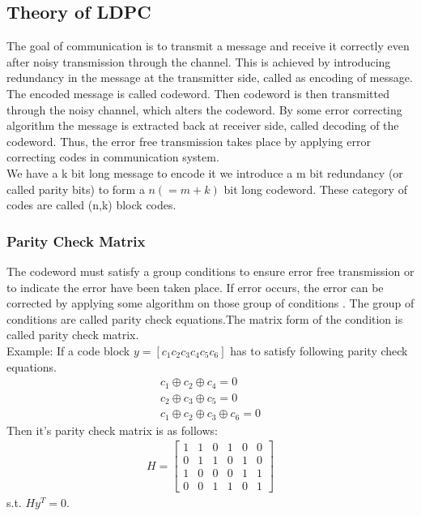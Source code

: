 \documentclass[twopage,12pt,a4paper]{report}
\begin{document}
\begin{raggedright}
\chapter{Theory of LDPC}


The goal of communication is to transmit a message and receive it correctly even after noisy transmission through the channel. This is achieved by introducing redundancy in the message at the transmitter side, called as encoding of message. The encoded message is called codeword. Then codeword is then transmitted through the noisy channel, which alters the codeword. By some error correcting algorithm the message is extracted back at receiver side, called decoding of the codeword. Thus, the error free transmission takes place by applying error correcting codes in communication system.\\
We have a k bit long message to encode it we introduce a m bit redundancy (or called parity bits) to form a $n(=m+k)$ bit long codeword. These category of codes are called (n,k) block codes. 

\subsection{Parity Check Matrix}

The codeword must satisfy a group conditions to ensure error free transmission or to indicate the error have been taken place. If error occurs, the error can be corrected by applying some algorithm on those group of conditions . The group of conditions are called parity check equations.The matrix form of the condition is called parity check matrix. \\
Example: If a code block $y=[c_1 c_2 c_3 c_4 c_5 c_6]$ has to satisfy following parity check equations. 
\begin{align}
c_1 \oplus c_2 \oplus c_4 =0 \\
 c_2 \oplus c_3 \oplus c_5 =0 \\
c_1 \oplus c_2 \oplus c_3 \oplus c_6 =0 
\end{align}  
Then it's parity check matrix is as follows:
\begin{align}
 H= \left[ \begin{array}{cccccc}
1 & 1 & 0 & 1 & 0 & 0\\
0 & 1 & 1 & 0 & 1 & 0\\
1 & 0 & 0 & 0 & 1 & 1\\
0 & 0 & 1 & 1 & 0 & 1  
\end{array} \right]  
\end{align} 
s.t. $Hy^T=0$.


\end{raggedright}
\end{document}
